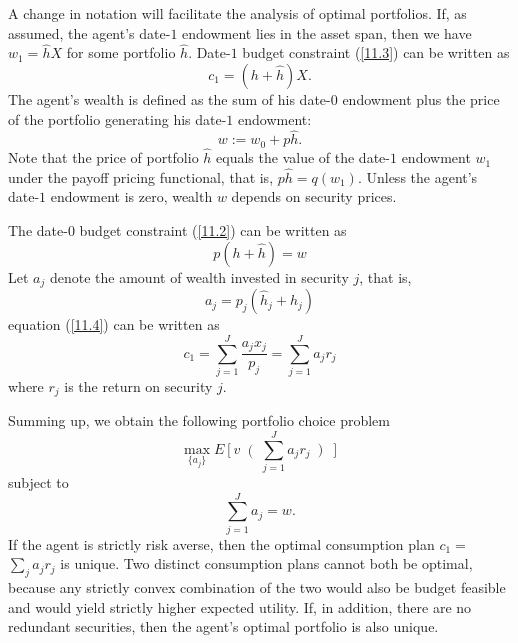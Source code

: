 \documentclass[\topdir/lecture\_notes.tex]{subfiles}
\begin{document}
A change in notation will facilitate the analysis of optimal portfolios. If, as assumed, the agent's date-$1$ endowment lies in the asset span, then we have $w_{1}=\hat{h} X$ for some portfolio $\hat{h}$. Date-$1$ budget constraint (\ref{11.3}) can be written as
\begin{equation}
c_{1}=(h+\hat{h}) X. \label{11.3}
\end{equation}
The agent's wealth is defined as the sum of his date-$0$ endowment plus the price of the portfolio generating his date-$1$ endowment:
\begin{equation}
w := w_{0}+p \hat{h}. \label{eq:wealth_definition} 
\end{equation}
Note that the price of portfolio $\hat{h}$ equals the value of the date-$1$ endowment $w_{1}$ under the payoff pricing functional, that is, $p \hat{h}=q\left(w_{1}\right)$. Unless the agent's date-$1$ endowment is zero, wealth $w$ depends on security prices.

The date-$0$ budget constraint (\ref{11.2}) can be written as
\begin{equation}
p(h+\hat{h})=w \label{11.4}
\end{equation}
Let $a_{j}$ denote the amount of wealth invested in security $j$, that is,
\begin{equation*}
a_{j}=p_{j}(\hat{h}_{j}+h_{j}) 
\end{equation*}
equation (\ref{11.4}) can be written as
\begin{equation*}
c_{1}=\sum_{j=1}^{J} \frac{a_{j} x_{j}}{p_{j}}=\sum_{j=1}^{J} a_{j} r_{j} 
\end{equation*}
where $r_{j}$ is the return on security $j$.

Summing up, we obtain the following portfolio choice problem
\begin{equation}
\max _{\{a_{j}\}} E\left[v\right(\sum_{j=1}^{J} a_{j} r_{j}\left)\right] \label{11.9}
\end{equation}
subject to
\begin{equation}
\sum_{j=1}^{J} a_{j}=w. \label{11.10}
\end{equation}
If the agent is strictly risk averse, then the optimal consumption plan $c_{1}=$ $\sum_{j} a_{j} r_{j}$ is unique. Two distinct consumption plans cannot both be optimal, because any strictly convex combination of the two would also be budget feasible and would yield strictly higher expected utility. If, in addition, there are no redundant securities, then the agent's optimal portfolio is also unique.
\end{document}
